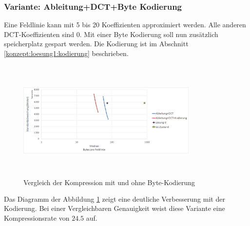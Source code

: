 \subsubsection{Variante: Ableitung+DCT+Byte Kodierung} \label{resultate:loesung1:ableitung_dct_kodierung}
Eine Feldlinie kann mit 5 bis 20 Koeffizienten approximiert werden. Alle anderen DCT-Koeffizienten sind 0. Mit einer Byte Kodierung soll nun zusätzlich speicherplatz gespart werden. Die Kodierung ist im Abschnitt \ref{konzept:loesung1:kodierung} beschrieben.
\begin{figure}[!htbp]
	\center
	\includegraphics[width=0.8\textwidth,height=6cm,keepaspectratio]{./pictures/resultate/loesung1/loesung1-6/loesung1_6.png}
	\caption{Vergleich der Kompression mit und ohne Byte-Kodierung}
	\label{resultate:loesung1:dct:kodierung}
\end{figure}
Das Diagramm der Abbildung \ref{resultate:loesung1:dct:kodierung} zeigt eine deutliche Verbesserung mit der Kodierung. Bei einer Vergleichbaren Genauigkeit weist diese Variante eine Kompressionsrate von $24.5$ auf.

